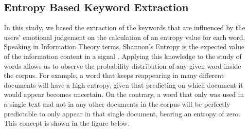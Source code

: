 \documentclass[review]{elsarticle}
\begin{document}
\subsection{Entropy Based Keyword Extraction}\label{entropy}

In this study, we based the extraction of the keywords that are influenced by the users’ emotional judgement on the calculation of an entropy value for each word. Speaking in Information Theory terms, Shannon’s Entropy is the expected value of the information content in a signal \cite[][]{shannon1948}. Applying this knowledge to the study of words allows us to observe the probability distribution of any given word inside the corpus. For example, a word that keeps reappearing in many different documents will have a high entropy, given that predicting on which document it would appear becomes uncertain. On the contrary, a word that only was used in a single text and not in any other documents in the corpus will be perfectly predictable to only appear in that single document, bearing an entropy of zero. This concept is shown in the figure below.
\end{document}
